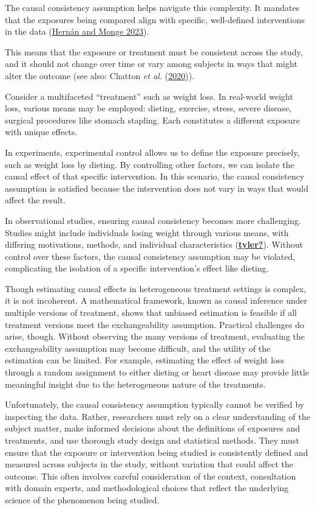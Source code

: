 \documentclass[
  singlecolumn]{article}
\begin{document}
The causal consistency assumption helps navigate this complexity. It
mandates that the exposures being compared align with specific,
well-defined interventions in the data
(\hyperref[ref-hernuxe1n2023]{Hernán and Monge 2023}).

This means that the exposure or treatment must be consistent across the
study, and it should not change over time or vary among subjects in ways
that might alter the outcome (see also: Chatton \emph{et al.}
(\hyperref[ref-chatton2020]{2020})).

Consider a multifaceted ``treatment'' such as weight loss. In real-world
weight loss, various means may be employed: dieting, exercise, stress,
severe disease, surgical procedures like stomach stapling. Each
constitutes a different exposure with unique effects.

In experiments, experimental control allows us to define the exposure
precisely, such as weight loss by dieting. By controlling other factors,
we can isolate the causal effect of that specific intervention. In this
scenario, the causal consistency assumption is satisfied because the
intervention does not vary in ways that would affect the result.

In observational studies, ensuring causal consistency becomes more
challenging. Studies might include individuals losing weight through
various means, with differing motivations, methods, and individual
characteristics (\hyperref[ref-tyler]{\textbf{tyler?}}). Without control
over these factors, the causal consistency assumption may be violated,
complicating the isolation of a specific intervention's effect like
dieting.

Though estimating causal effects in heterogeneous treatment settings is
complex, it is not incoherent. A mathematical framework, known as causal
inference under multiple versions of treatment, shows that unbiased
estimation is feasible if all treatment versions meet the
exchangeability assumption. Practical challenges do arise, though.
Without observing the many versions of treatment, evaluating the
exchangeability assumption may become difficult, and the utility of the
estimation can be limited. For example, estimating the effect of weight
loss through a random assignment to either dieting or heart disease may
provide little meaningful insight due to the heterogeneous nature of the
treatments.

Unfortunately, the causal consistency assumption typically cannot be
verified by inspecting the data. Rather, researchers must rely on a
clear understanding of the subject matter, make informed decisions about
the definitions of exposures and treatments, and use thorough study
design and statistical methods. They must ensure that the exposure or
intervention being studied is consistently defined and measured across
subjects in the study, without variation that could affect the outcome.
This often involves careful consideration of the context, consultation
with domain experts, and methodological choices that reflect the
underlying science of the phenomenon being studied.
\end{document}
